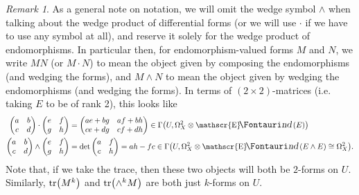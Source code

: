 \documentclass[11pt,fleqn]{article}
\theoremstyle{plain}
\theoremstyle{definition}
\theoremstyle{remark}
\newtheorem{remark}[theorem]{Remark}
\numberwithin{equation}{theorem}
\DeclareMathOperator{\sheafend}{\mathscr{E}\textup{\kern -2pt {\large\Fontauri\slshape nd}}\,}
\begin{document}
        \begin{remark}
            As a general note on notation, we will omit the wedge symbol $\wedge$ when talking about the wedge product of differential forms (or we will use $\cdot$ if we have to use any symbol at all), and reserve it solely for the wedge product of endomorphisms.
            In particular then, for endomorphism-valued forms $M$ and $N$, we write $MN$ (or $M\cdot N$) to mean the object given by composing the endomorphisms (and wedging the forms), and $M\wedge N$ to mean the object given by wedging the endomorphisms (and wedging the forms).
            In terms of $(2\times2)$-matrices (i.e. taking $E$ to be of rank 2), this looks like
            \begin{align*}
                \begin{pmatrix}
                    a&b\\
                    c&d
                \end{pmatrix}\cdot
                \begin{pmatrix}
                    e&f\\
                    g&h
                \end{pmatrix}
                &= 
                \begin{pmatrix}
                    ae+bg&af+bh\\
                    ce+dg&cf+dh
                \end{pmatrix}
                \in\Gamma\big(U,\Omega_X^2\otimes\sheafend(E)\big)\\
                \begin{pmatrix}
                    a&b\\
                    c&d
                \end{pmatrix}\wedge
                \begin{pmatrix}
                    e&f\\
                    g&h
                \end{pmatrix}
                &= 
                \det\begin{pmatrix}
                    a&f\\
                    c&h
                \end{pmatrix}=ah-fc
                \in\Gamma\big(U,\Omega_X^2\otimes\sheafend(E\wedge E)\cong\Omega_X^2\big).
            \end{align*}
            Note that, if we take the trace, then these two objects will both be $2$-forms on $U$.
            Similarly, $\tr(M^k)$ and $\tr(\wedge^kM)$ are both just $k$-forms on $U$.
        \end{remark}
\end{document}
